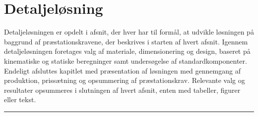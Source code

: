 \chapter{Detaljeløsning} \label{Detaljeløsning}
Detaljeløsningen er opdelt i afsnit, der hver har til formål, at udvikle løsningen på baggrund af præstationskravene, der beskrives i starten af hvert afsnit. Igennem detaljeløsningen foretages valg af materiale, dimensionering og design, baseret på kinematiske og statiske beregninger samt undersøgelse af standardkomponenter. Endeligt afsluttes kapitlet med præsentation af løsningen med gennemgang af produktion, prissætning og opsummering af præstationskrav. Relevante valg og resultater opsummeres i slutningen af hvert afsnit, enten med tabeller, figurer eller tekst.   



%

\plainbreak{2}


